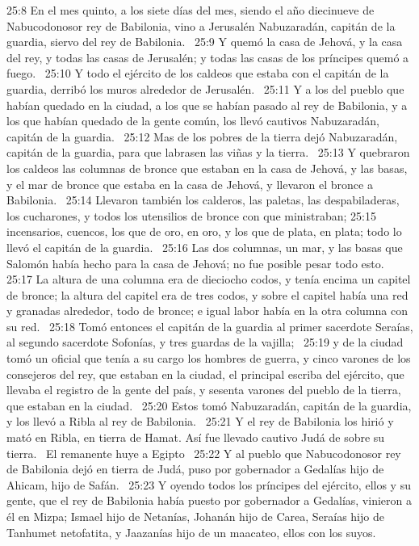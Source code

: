 25:8 En el mes quinto, a los siete días del mes, siendo el año diecinueve de Nabucodonosor rey de Babilonia, vino a Jerusalén Nabuzaradán, capitán de la guardia, siervo del rey de Babilonia.  
25:9 Y quemó la casa de Jehová, y la casa del rey, y todas las casas de Jerusalén; y todas las casas de los príncipes quemó a fuego.  
25:10 Y todo el ejército de los caldeos que estaba con el capitán de la guardia, derribó los muros alrededor de Jerusalén.  
25:11 Y a los del pueblo que habían quedado en la ciudad, a los que se habían pasado al rey de Babilonia, y a los que habían quedado de la gente común, los llevó cautivos Nabuzaradán, capitán de la guardia.  
25:12 Mas de los pobres de la tierra dejó Nabuzaradán, capitán de la guardia, para que labrasen las viñas y la tierra.  
25:13 Y quebraron los caldeos las columnas de bronce que estaban en la casa de Jehová, y las basas, y el mar de bronce que estaba en la casa de Jehová, y llevaron el bronce a Babilonia.  
25:14 Llevaron también los calderos, las paletas, las despabiladeras, los cucharones, y todos los utensilios de bronce con que ministraban; 
25:15 incensarios, cuencos, los que de oro, en oro, y los que de plata, en plata; todo lo llevó el capitán de la guardia.  
25:16 Las dos columnas, un mar, y las basas que Salomón había hecho para la casa de Jehová; no fue posible pesar todo esto.  
25:17 La altura de una columna era de dieciocho codos, y tenía encima un capitel de bronce; la altura del capitel era de tres codos, y sobre el capitel había una red y granadas alrededor, todo de bronce; e igual labor había en la otra columna con su red.  
25:18 Tomó entonces el capitán de la guardia al primer sacerdote Seraías, al segundo sacerdote Sofonías, y tres guardas de la vajilla;  
25:19 y de la ciudad tomó un oficial que tenía a su cargo los hombres de guerra, y cinco varones de los consejeros del rey, que estaban en la ciudad, el principal escriba del ejército, que llevaba el registro de la gente del país, y sesenta varones del pueblo de la tierra, que estaban en la ciudad.  
25:20 Estos tomó Nabuzaradán, capitán de la guardia, y los llevó a Ribla al rey de Babilonia.  
25:21 Y el rey de Babilonia los hirió y mató en Ribla, en tierra de Hamat. Así fue llevado cautivo Judá de sobre su tierra.  
El remanente huye a Egipto  
25:22 Y al pueblo que Nabucodonosor rey de Babilonia dejó en tierra de Judá, puso por gobernador a Gedalías hijo de Ahicam, hijo de Safán.  
25:23 Y oyendo todos los príncipes del ejército, ellos y su gente, que el rey de Babilonia había puesto por gobernador a Gedalías, vinieron a él en Mizpa; Ismael hijo de Netanías, Johanán hijo de Carea, Seraías hijo de Tanhumet netofatita, y Jaazanías hijo de un maacateo, ellos con los suyos.  
